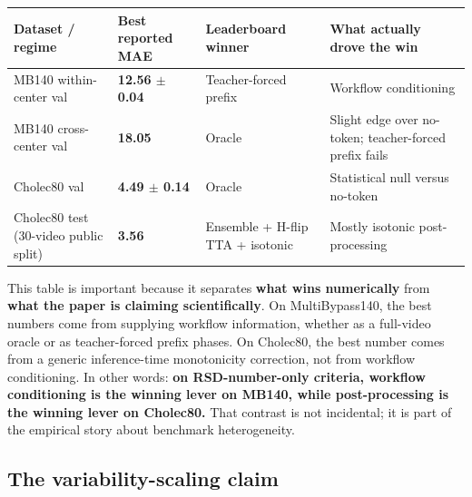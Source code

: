 \begin{longtable}[]{@{}
  >{\raggedright\arraybackslash}p{}
  >{\raggedleft\arraybackslash}p{}
  >{\raggedright\arraybackslash}p{}
  >{\raggedright\arraybackslash}p{}@{}}
\toprule\noalign{}
\begin{minipage}[b]{\linewidth}\raggedright
Dataset / regime
\end{minipage} & \begin{minipage}[b]{\linewidth}\raggedleft
Best reported MAE
\end{minipage} & \begin{minipage}[b]{\linewidth}\raggedright
Leaderboard winner
\end{minipage} & \begin{minipage}[b]{\linewidth}\raggedright
What actually drove the win
\end{minipage} \\
\midrule\noalign{}
\endhead
\bottomrule\noalign{}
\endlastfoot
MB140 within-center val & \textbf{12.56 $\pm$ 0.04} & Teacher-forced prefix
& Workflow conditioning \\
MB140 cross-center val & \textbf{18.05} & Oracle & Slight edge over
no-token; teacher-forced prefix fails \\
Cholec80 val & \textbf{4.49 $\pm$ 0.14} & Oracle & Statistical null versus
no-token \\
Cholec80 test (30-video public split) & \textbf{3.56} & Ensemble +
H-flip TTA + isotonic & Mostly isotonic post-processing \\
\end{longtable}

This table is important because it separates \textbf{what wins
numerically} from \textbf{what the paper is claiming scientifically}. On
MultiBypass140, the best numbers come from supplying workflow
information, whether as a full-video oracle or as teacher-forced prefix
phases. On Cholec80, the best number comes from a generic inference-time
monotonicity correction, not from workflow conditioning. In other words:
\textbf{on RSD-number-only criteria, workflow conditioning is the
winning lever on MB140, while post-processing is the winning lever on
Cholec80.} That contrast is not incidental; it is part of the empirical
story about benchmark heterogeneity.

\subsection{The variability-scaling claim}\label{the-variability-scaling-claim}

